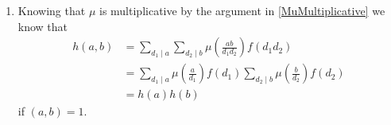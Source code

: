 \documentclass[12pt]{article}
\begin{document}
\begin{enumerate}
\item %
Knowing that $\mu$ is multiplicative by the argument
in \autoref{MuMultiplicative} we know that
\begin{align*}
h\left(a,b\right)
&=\sum_{d_1\mid a}\sum_{d_2\mid b}
\mu\left(\frac{ab}{d_1d_2}\right)f\left(d_1d_2\right)\\
&=\sum_{d_1\mid a}
\mu\left(\frac{a}{d_1}\right)f\left(d_1\right)
\sum_{d_2\mid b}
\mu\left(\frac{b}{d_2}\right)f\left(d_2\right)\\
&=h\left(a\right)h\left(b\right)
\end{align*}
if $\left(a,b\right)=1$.

\end{enumerate}
\end{document}
